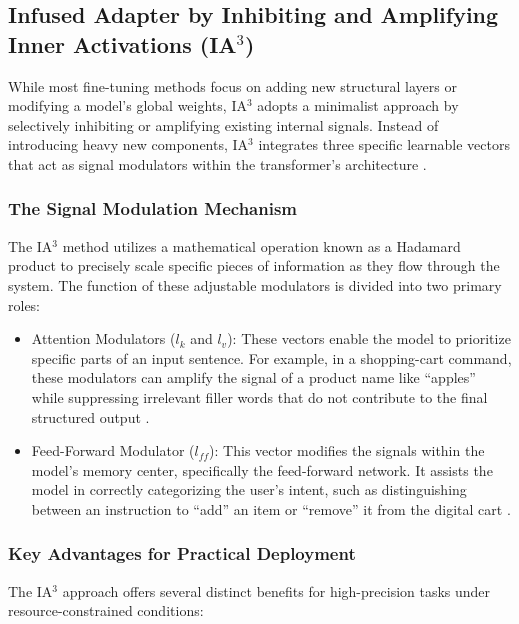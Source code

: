 \documentclass[journal,article,submit,pdftex,moreauthors]{Definitions/mdpi}
\begin{document}
\subsection{Infused Adapter by Inhibiting and Amplifying Inner Activations (IA$^3$)}

While most fine-tuning methods focus on adding new structural layers or modifying a model's global weights, IA$^3$ adopts a minimalist approach by selectively inhibiting or amplifying existing internal signals. Instead of introducing heavy new components, IA$^3$ integrates three specific learnable vectors that act as signal modulators within the transformer's architecture \cite{liu2022fewshotparameterefficientfinetuningbetter}.



\subsubsection{The Signal Modulation Mechanism}
The IA$^3$ method utilizes a mathematical operation known as a Hadamard product to precisely scale specific pieces of information as they flow through the system. The function of these adjustable modulators is divided into two primary roles:

\begin{itemize}
    \item Attention Modulators ($l_k$ and $l_v$): These vectors enable the model to prioritize specific parts of an input sentence. For example, in a shopping-cart command, these modulators can amplify the signal of a product name like ``apples'' while suppressing irrelevant filler words that do not contribute to the final structured output \cite{10920340}.
    \item Feed-Forward Modulator ($l_{ff}$): This vector modifies the signals within the model's memory center, specifically the feed-forward network. It assists the model in correctly categorizing the user's intent, such as distinguishing between an instruction to ``add'' an item or ``remove'' it from the digital cart \cite{10920340}.
\end{itemize}

\subsubsection{Key Advantages for Practical Deployment}
The IA$^3$ approach offers several distinct benefits for high-precision tasks under resource-constrained conditions:
\end{document}
